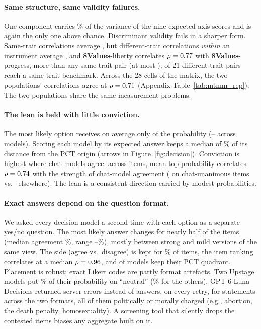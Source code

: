 \documentclass[11pt]{article}
\newcommand{\instEV}[1]{\textcolor{cEV}{\textbf{#1}}}
\newcommand{\ev}{\instEV{8Values}\xspace}
\begin{document}
\paragraph{Same structure, same validity failures.}
One component carries \nDPCOne\% of the variance of the nine expected axis scores and is again the only one above chance. Discriminant validity fails in a sharper form. Same-trait correlations average \nDMono, but different-trait correlations \emph{within} an instrument average \nDHM, and \ev-liberty correlates $\rho=0.77$ with \ev-progress, more than any same-trait pair (at most \nDMaxMono); \nDViol{} of 21 different-trait pairs reach a same-trait benchmark. Across the 28 cells of the matrix, the two populations' correlations agree at $\rho=0.71$ (Appendix Table~\ref{tab:mtmm_rep}). The two populations share the same measurement problems.

\paragraph{The lean is held with little conviction.}
The most likely option receives on average only \nDTopP{} of the probability (\nDTopPLo--\nDTopPHi{} across models). Scoring each model by its expected answer keeps a median of \nDShrink\% of its distance from the PCT origin (arrows in Figure~\ref{fig:decision}). Conviction is highest where chat models agree: across items, mean top probability correlates $\rho=0.74$ with the strength of chat-model agreement (\nDTopPUnan{} on chat-unanimous items vs.\ \nDTopPOther{} elsewhere). The lean is a consistent direction carried by modest probabilities.

\paragraph{Exact answers depend on the question format.}
We asked every decision model a second time with each option as a separate yes/no question. The most likely answer changes for nearly half of the items (median agreement \nFSameTop\%, range \nFSameTopLo--\nFSameTopHi\%), mostly between strong and mild versions of the same view. The side (agree vs.\ disagree) is kept for \nFSameSide\% of items, the item ranking correlates at a median $\rho=0.96$, and \nFSameQuad{} of \nFNQuad{} models keep their PCT quadrant. Placement is robust; exact Likert codes are partly format artefacts. Two Upstage models put \nDSolarNeutral\% of their probability on ``neutral'' (\nDOtherNeutral\% for the others). GPT-6 Luna Decisions returned server errors instead of answers, on every retry, for \nLunaRefUnion{} statements across the two formats, all of them politically or morally charged (e.g., abortion, the death penalty, homosexuality). A screening tool that silently drops the contested items biases any aggregate built on it.
\end{document}
